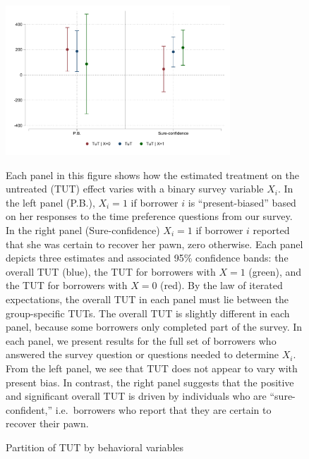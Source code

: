 \documentclass[oneside,11pt]{article}
\begin{document}
\begin{figure}[H]
    \caption{Partition of TUT by behavioral variables}
    \label{tut_beh_partition}
    \begin{center}
        \centering
        \includegraphics[width=0.75\textwidth]{Figuras/tut_beh_partition.pdf} 
    \end{center}
     \scriptsize  Each panel in this figure shows how the estimated treatment on the untreated (TUT) effect varies with a binary survey variable $X_i$. In the left panel (P.B.), $X_i = 1$ if borrower $i$ is ``present-biased'' based on her responses to the time preference questions from our survey. In the right panel (Sure-confidence) $X_i = 1$ if  borrower $i$ reported that she was certain to recover her pawn, zero otherwise. Each panel depicts three estimates and associated 95\% confidence bands: the overall TUT (blue), the TUT for borrowers with $X = 1$ (green), and the TUT for borrowers with $X = 0$ (red). By the law of iterated expectations, the overall TUT in each panel must lie between the group-specific TUTs. The overall TUT is slightly different in each panel, because some borrowers only completed part of the survey. In each panel, we present results for the full set of borrowers who answered the survey question or questions needed to determine $X_i$. From the left panel, we see that TUT does not appear to vary with present bias. In contrast, the right panel suggests that the positive and significant overall TUT is driven by individuals who are ``sure-confident,'' i.e.\ borrowers who report that they are certain to recover their pawn.

\end{figure}
\end{document}
